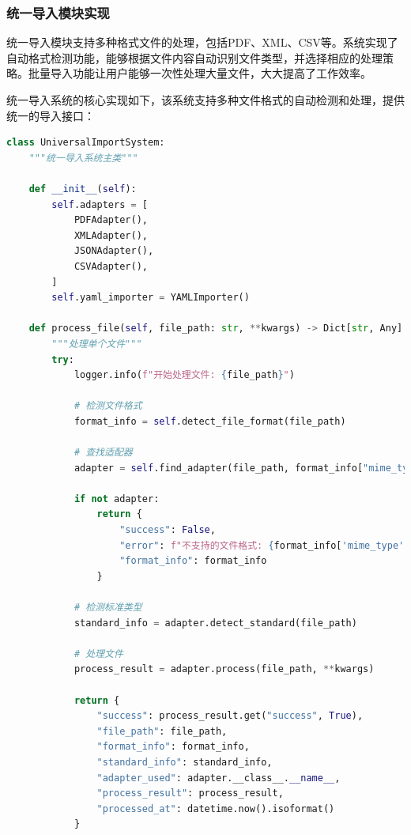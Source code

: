 \subsubsection{统一导入模块实现}

统一导入模块支持多种格式文件的处理，包括PDF、XML、CSV等。系统实现了自动格式检测功能，能够根据文件内容自动识别文件类型，并选择相应的处理策略。批量导入功能让用户能够一次性处理大量文件，大大提高了工作效率。

统一导入系统的核心实现如下，该系统支持多种文件格式的自动检测和处理，提供统一的导入接口：

\begin{lstlisting}[language=Python, label=fig:universal_import]
class UniversalImportSystem:
    """统一导入系统主类"""
    
    def __init__(self):
        self.adapters = [
            PDFAdapter(),
            XMLAdapter(),
            JSONAdapter(),
            CSVAdapter(),
        ]
        self.yaml_importer = YAMLImporter()
    
    def process_file(self, file_path: str, **kwargs) -> Dict[str, Any]:
        """处理单个文件"""
        try:
            logger.info(f"开始处理文件: {file_path}")
            
            # 检测文件格式
            format_info = self.detect_file_format(file_path)
            
            # 查找适配器
            adapter = self.find_adapter(file_path, format_info["mime_type"])
            
            if not adapter:
                return {
                    "success": False,
                    "error": f"不支持的文件格式: {format_info['mime_type']}",
                    "format_info": format_info
                }
            
            # 检测标准类型
            standard_info = adapter.detect_standard(file_path)
            
            # 处理文件
            process_result = adapter.process(file_path, **kwargs)
            
            return {
                "success": process_result.get("success", True),
                "file_path": file_path,
                "format_info": format_info,
                "standard_info": standard_info,
                "adapter_used": adapter.__class__.__name__,
                "process_result": process_result,
                "processed_at": datetime.now().isoformat()
            }
            

\end{lstlisting}
